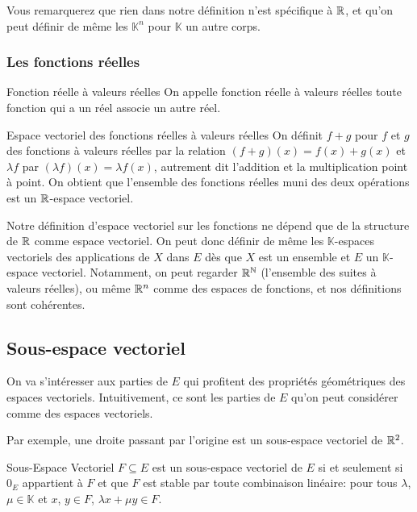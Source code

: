 \documentclass{classe}
\renewcommand*{\K}{\mathbb{K}}
\begin{document}
Vous remarquerez que rien dans notre définition n'est spécifique à $\mathbb{R}$, et qu'on peut définir de même les $\K^{n}$ pour $\K$ un autre corps.

\subsubsection{Les fonctions réelles}

\begin{définition}{Fonction réelle à valeurs réelles}{}
On appelle fonction réelle à valeurs réelles toute fonction qui a un réel associe un autre réel.
\end{définition}

\begin{théorème}{Espace vectoriel des fonctions réelles à valeurs réelles}{}
	On définit $f+g$ pour $f$ et $g$ des fonctions à valeurs réelles par la relation $(f+g)(x) = f(x)+g(x)$ et $\lambda f$ par $(\lambda f)(x) = \lambda f(x)$, autrement dit l'addition et la multiplication point à point.
	On obtient que l'ensemble des fonctions réelles muni des deux opérations est un $\mathbb{R}$-espace vectoriel.
\end{théorème}

Notre définition d'espace vectoriel sur les fonctions ne dépend que de la structure de $\mathbb{R}$ comme espace vectoriel.
On peut donc définir de même les $\K$-espaces vectoriels des applications de $X$ dans $E$ dès que $X$ est un ensemble et $E$ un $\K$-espace vectoriel.
Notamment, on peut regarder $\mathbb{R}^{\mathbb{N}}$ (l'ensemble des suites à valeurs réelles), ou même $\mathbb{R}^{n}$ comme des espaces de fonctions, et nos définitions sont cohérentes.

\subsection{Sous-espace vectoriel}

On va s'intéresser aux parties de $E$ qui profitent des propriétés géométriques des espaces vectoriels. Intuitivement, ce sont les parties de $E$ qu'on peut considérer comme des espaces vectoriels.

\begin{example}{}
	Par exemple, une droite passant par l'origine est un sous-espace vectoriel de $\mathbb{R}^2$.
\end{example}

\begin{définition}{Sous-Espace Vectoriel}{}
	$F \subseteq E$ est un sous-espace vectoriel de $E$ si et seulement si $0_E$ appartient à $F$ et que $F$ est stable par toute combinaison linéaire: pour tous $\lambda$, $\mu \in \K$ et $x$, $y\in F$, $\lambda x + \mu y \in F$.
\end{définition}
\end{document}
